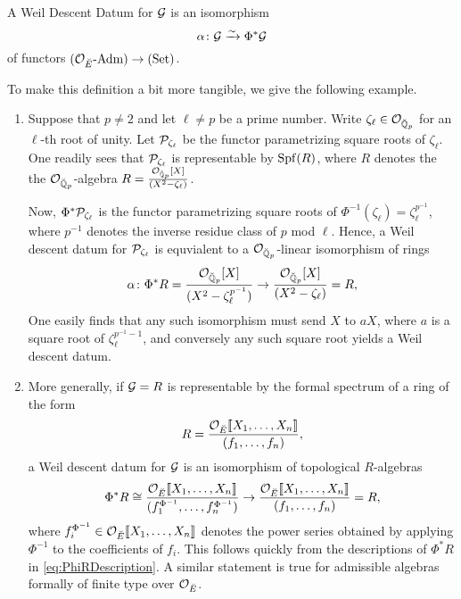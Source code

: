 \documentclass[../main.tex]{subfiles}
\begin{document}
\begin{defi}\label{def:WeilDescentDatum}
  A Weil Descent Datum for $\mathcal{G}$ is an isomorphism
  \begin{equation*}
    \alpha \colon \mathcal{G} \xrightarrow{\sim} \Phi^* \mathcal{G}
  \end{equation*}
  of functors ${({\mathcal{O}_{\breve {E}}}\textnormal-\allowbreak\mathrm{Adm})} \to {(\mathrm{Set})}$.
\end{defi}

To make this definition a bit more tangible, we give the following example.

\begin{xpl}
  \begin{enumerate}
    \item Suppose that $p \neq 2$ and let $\ell \neq p$ be a prime number. Write 
  $\zeta_\ell \in \mathcal{O}_{{\breve {\mathbb{Q}}}_p}$ for an $\ell$-th root of unity. Let
  $\mathcal{P}_{\zeta_\ell}$ be the functor parametrizing
  square roots of $\zeta_\ell$. One readily sees that $\mathcal{P}_{\zeta_\ell}$ is
  representable by 
  $\operatorname{Spf}(R)$, where $R$ denotes the the $\mathcal{O}_{{\breve {\mathbb{Q}}}_p}$-algebra
  $R = \frac{\mathcal{O}_{{\breve {\mathbb{Q}}}_p}[X]}{(X^2 - \zeta_\ell)}$. 

  Now, $\Phi^*\mathcal{P}_{\zeta_\ell}$ is the functor
  parametrizing square roots of $\Phi^{-1}(\zeta_\ell) = \zeta_\ell^{p^{-1}}$,
  where $p^{-1}$ denotes the inverse residue class of $p$ mod $\ell$. 
  Hence, a Weil descent datum for $\mathcal{P}_{\zeta_\ell}$ is equvialent to a 
  $\mathcal{O}_{{\breve {\mathbb{Q}}}_p}$-linear isomorphism of rings
  \begin{equation*}
    \alpha \colon \Phi^* R = \frac{\mathcal{O}_{{\breve {\mathbb{Q}}}_p}[X]}{(X^2 - \zeta_\ell^{p^{-1}})} \to
    \frac{\mathcal{O}_{{\breve {\mathbb{Q}}}_p}[X]}{(X^2 - \zeta_\ell)} = R, 
  \end{equation*}
  One easily finds that any such isomorphism must send $X$ to $aX$, where $a$
  is a square root of $\zeta_\ell^{p^{-1}-1}$, and conversely any such square
  root yields a Weil descent datum.
    \item More generally, if $\mathcal{G} = R$ is representable by the formal spectrum of a 
      ring of the form
      \begin{equation*}
        R = \frac{ \mathcal{O}_{{\breve {E}}}\llbracket X_1, \dots, X_n \rrbracket}{(f_1, \dots,
        f_n)},
      \end{equation*} a Weil descent datum 
      for $\mathcal{G}$ is an isomorphism of topological $R$-algebras
      \begin{equation*}
        \Phi^* R \cong \frac{ \mathcal{O}_{{\breve {E}}} \llbracket X_1, \dots, X_n \rrbracket}{(f_1^{\Phi^{-1}},
        \dots, f_n^{\Phi^{-1}})}
        \to 
        \frac{ \mathcal{O}_{{\breve {E}}}\llbracket X_1, \dots, X_n \rrbracket}{(f_1, \dots,
        f_n)} = R,
      \end{equation*}
      where $f_i^{\Phi^{-1}} \in \mathcal{O}_{\breve {E}}\llbracket X_1, \dots, X_n\rrbracket$ denotes the 
      power series obtained by applying $\Phi^{-1}$ to the coefficients of $f_i$.
      This follows quickly from the descriptions of $\Phi^*R$ in
      \eqref{eq:PhiRDescription}. A similar statement is true for admissible algebras
      formally of finite type over $\mathcal{O}_{\breve {E}}$.
  \end{enumerate}
\end{xpl}
\end{document}
